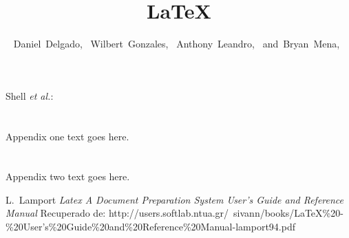\documentclass[10pt,journal,compsoc]{IEEEtran}
\begin{document}
\title{\LaTeX}

\author{Daniel~Delgado,~
        Wilbert~Gonzales,~
        Anthony~Leandro,~
        and~Bryan~Mena,~
}
{Shell \MakeLowercase{\textit{et al.}}: \LaTex}

\maketitle

\IEEEdisplaynontitleabstractindextext

\IEEEpeerreviewmaketitle


\appendices
\section{}
Appendix one text goes here.

\section{}
Appendix two text goes here.

\begin{thebibliography}{1}
	
	L.~Lamport \emph{Latex A Document Preparation System User's Guide and Reference Manual} Recuperado de:
	http://users.softlab.ntua.gr/~sivann/books/LaTeX\%20-\%20User's\%20Guide\%20and\%20Reference\%20Manual-lamport94.pdf
	
\end{thebibliography}
\end{document}
